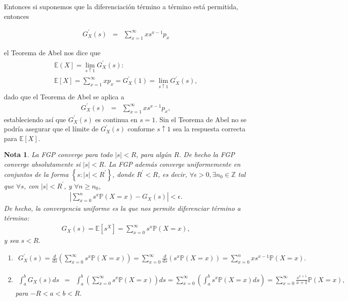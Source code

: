 \documentclass{article}
\newtheorem{Note}{Nota}[section]
\newcommand{\ent}{\mathbb{Z}}
\newcommand{\esp}{\mathbb{E}}
\newcommand{\prob}{\mathbb{P}}
\numberwithin{equation}{section}
\begin{document}
Entonces si suponemos que la diferenciaci\'on t\'ermino a t\'ermino est\'a permitida, entonces

\begin{eqnarray}
G_{X}^{'}\left(s\right)&=&\sum_{x=1}^{\infty}xs^{x-1}p_{x}
\end{eqnarray}

el Teorema de Abel nos dice que
\begin{eqnarray}
\begin{array}{l}
\esp\left(X\right]=\lim_{s\uparrow1}G_{X}^{'}\left(s\right):\\
\esp\left[X\right]=\sum_{x=1}^{\infty}xp_{x}=G_{X}^{'}\left(1\right)=\lim_{s\uparrow1}G_{X}^{'}\left(s\right),
\end{array}
\end{eqnarray}
dado que el Teorema de Abel se aplica a
\begin{eqnarray}
G_{X}^{'}\left(s\right)&=&\sum_{x=1}^{\infty}xs^{x-1}p_{x},
\end{eqnarray}
estableciendo as\'i que $G_{X}^{'}\left(s\right)$ es continua en $s=1$. Sin el Teorema de Abel no se podr\'ia asegurar que el l\'imite de $G_{X}^{'}\left(s\right)$ conforme $s\uparrow1$ sea la respuesta correcta para $\esp\left[X\right]$.

\begin{Note}
La FGP converge para todo $|s|<R$, para alg\'un $R$. De hecho la FGP converge absolutamente si $|s|<R$. La FGP adem\'as converge uniformemente en conjuntos de la forma $\left\{s:|s|<R^{'}\right\}$, donde $R^{'}<R$, es decir, $\forall\epsilon>0, \exists n_{0}\in\ent$ tal que $\forall s$, con $|s|<R^{'}$, y $\forall n\geq n_{0}$,
\begin{eqnarray}
|\sum_{x=0}^{n}s^{x}\prob\left(X=x\right)-G_{X}\left(s\right)|<\epsilon.
\end{eqnarray}
De hecho, la convergencia uniforme es la que nos permite diferenciar t\'ermino a t\'ermino:
\begin{eqnarray}
G_{X}\left(s\right)=\esp\left[s^{X}\right]=\sum_{x=0}^{\infty}s^{x}\prob\left(X=x\right),
\end{eqnarray}
y sea $s<R$.
\begin{enumerate}
\item
\begin{eqnarray}
G_{X}^{'}\left(s\right)=\frac{d}{ds}\left(\sum_{x=0}^{\infty}s^{x}\prob\left(X=x\right)\right)=\sum_{x=0}^{\infty}\frac{d}{ds}\left(s^{x}\prob\left(X=x\right)\right)=\sum_{x=0}^{n}xs^{x-1}\prob\left(X=x\right).
\end{eqnarray}

\item\begin{eqnarray}
\int_{a}^{b}G_{X}\left(s\right)ds&=&\int_{a}^{b}\left(\sum_{x=0}^{\infty}s^{x}\prob\left(X=x\right)\right)ds=\sum_{x=0}^{\infty}\left(\int_{a}^{b}s^{x}\prob\left(X=x\right)ds\right)=\sum_{x=0}^{\infty}\frac{s^{x+1}}{x+1}\prob\left(X=x\right),
\end{eqnarray}
para $-R<a<b<R$.
\end{enumerate}
\end{Note}
\end{document}
